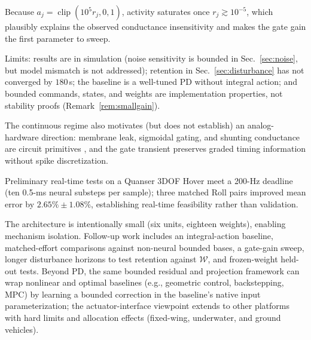 \documentclass[letterpaper, 10 pt, conference]{ieeeconf}
\newcommand{\clip}{\operatorname{clip}}
\begin{document}
Because $a_j=\clip(10^5r_j,0,1)$, activity saturates once $r_j\gtrsim10^{-5}$, which plausibly explains the observed conductance insensitivity and makes the gate gain the first parameter to sweep.

Limits: results are in simulation (noise sensitivity is bounded in Sec.~\ref{sec:noise}, but model mismatch is not addressed); retention in Sec.~\ref{sec:disturbance} has not converged by $180$\,s; the baseline is a well-tuned PD without integral action; and bounded commands, states, and weights are implementation properties, not stability proofs (Remark~\ref{rem:smallgain}).

The continuous regime also motivates (but does not establish) an analog-hardware direction: membrane leak, sigmoidal gating, and shunting conductance are circuit primitives \cite{mahowald1991vlsi}, and the gate transient preserves graded timing information without spike discretization.

Preliminary real-time tests on a Quanser 3DOF Hover meet a 200-Hz deadline (ten 0.5-ms neural substeps per sample); three matched Roll pairs improved mean error by $2.65\%\pm1.08\%$, establishing real-time feasibility rather than validation.

The architecture is intentionally small (six units, eighteen weights), enabling mechanism isolation. Follow-up work includes an integral-action baseline, matched-effort comparisons against non-neural bounded bases, a gate-gain sweep, longer disturbance horizons to test retention against $\mathcal W$, and frozen-weight held-out tests. Beyond PD, the same bounded residual and projection framework can wrap nonlinear and optimal baselines (e.g., geometric control, backstepping, MPC) by learning a bounded correction in the baseline's native input parameterization; the actuator-interface viewpoint extends to other platforms with hard limits and allocation effects (fixed-wing, underwater, and ground vehicles).





\end{document}
